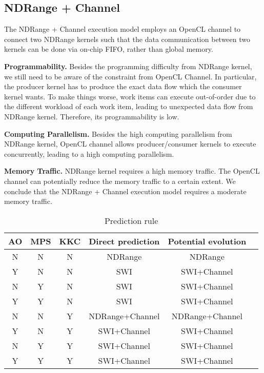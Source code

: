 
\vspace{-1ex}
\subsection{NDRange + Channel}
The NDRange + Channel execution model employs an OpenCL channel to connect two NDRange kernels such that the data communication between two kernels can be done via on-chip FIFO, rather than global memory. 

{\bf Programmability. }Besides the programming difficulty from NDRange kernel, we still need to be aware of the constraint from OpenCL Channel. In particular, the producer kernel has to produce the exact data flow which the consumer kernel wants. To make things worse, work items can execute out-of-order due to the different workload of each work item, leading to unexpected data flow from NDRange kernel. Therefore, its programmability is low.

{\bf Computing Parallelism. }
Besides the high computing parallelism from NDRange kernel, OpenCL channel allows producer/consumer kernels to execute concurrently, leading to a high computing parallelism.  

{\bf Memory Traffic. }NDRange kernel requires a high memory traffic. The OpenCL channel can potentially reduce the memory traffic to a certain extent. We conclude that the NDRange + Channel execution model requires a moderate memory traffic. 

\begin{table}%
	\centering
	\begin{scriptsize}
		\begin{tabular}{|c|c|c|c|c|c|}
			\hline
			AO & MPS & KKC & Direct prediction & Potential evolution \\		
			\hline
			N & N & N & NDRange & NDRange  \\
			\hline
			Y & N & N & SWI  & SWI+Channel  \\
			\hline
			N & Y & N & SWI & SWI+Channel  \\
			\hline
			Y & Y & N & SWI & SWI+Channel  \\
			\hline
			N & N & Y & NDRange+Channel & NDRange+Channel \\
			\hline
			Y & N & Y & SWI+Channel & SWI+Channel  \\
			\hline
			N & Y & Y & SWI+Channel & SWI+Channel  \\
			\hline
			Y & Y & Y & SWI+Channel & SWI+Channel \\
			\hline
		\end{tabular}
	\end{scriptsize}
	\caption{Prediction rule}
	\label{t_pattern_to_model}
	\vspace{-6ex}
\end{table}


